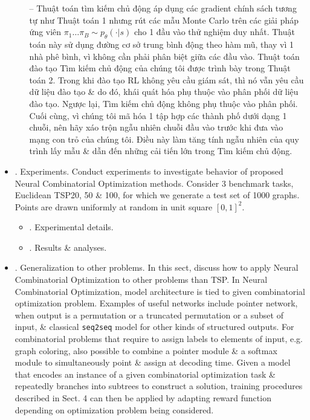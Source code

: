 \documentclass{article}
\begin{document}
\begin{itemize}
\begin{enumerate}
        -- Thuật toán tìm kiếm chủ động áp dụng các gradient chính sách tương tự như Thuật toán 1 nhưng rút các mẫu Monte Carlo trên các giải pháp ứng viên $\pi_1\ldots\pi_B\sim p_\theta(\cdot|s)$ cho 1 đầu vào thử nghiệm duy nhất. Thuật toán này sử dụng đường cơ sở trung bình động theo hàm mũ, thay vì 1 nhà phê bình, vì không cần phải phân biệt giữa các đầu vào. Thuật toán đào tạo Tìm kiếm chủ động của chúng tôi được trình bày trong Thuật toán 2. Trong khi đào tạo RL không yêu cầu giám sát, thì nó vẫn yêu cầu dữ liệu đào tạo \& do đó, khái quát hóa phụ thuộc vào phân phối dữ liệu đào tạo. Ngược lại, Tìm kiếm chủ động không phụ thuộc vào phân phối. Cuối cùng, vì chúng tôi mã hóa 1 tập hợp các thành phố dưới dạng 1 chuỗi, nên hãy xáo trộn ngẫu nhiên chuỗi đầu vào trước khi đưa vào mạng con trỏ của chúng tôi. Điều này làm tăng tính ngẫu nhiên của quy trình lấy mẫu \& dẫn đến những cải tiến lớn trong Tìm kiếm chủ động.
    \end{enumerate}
    \item {. Experiments.} Conduct experiments to investigate behavior of proposed Neural Combinatorial Optimization methods. Consider 3 benchmark tasks, Euclidean TSP20, 50 \& 100, for which we generate a test set of 1000 graphs. Points are drawn uniformly at random in unit square $[0,1]^2$.
    \begin{itemize}
        \item {. Experimental details.}
        \item {. Results \& analyses.}
    \end{itemize}
    \item {. Generalization to other problems.} In this sect, discuss how to apply Neural Combinatorial Optimization to other problems than TSP. In Neural Combinatorial Optimization, model architecture is tied to given combinatorial optimization problem. Examples of useful networks include pointer network, when output is a permutation or a truncated permutation or a subset of input, \& classical {\tt seq2seq} model for other kinds of structured outputs. For combinatorial problems that require to assign labels to elements of input, e.g. graph coloring, also possible to combine a pointer module \& a softmax module to simultaneously point \& assign at decoding time. Given a model that encodes an instance of a given combinatorial optimization task \& repeatedly branches into subtrees to construct a solution, training procedures described in Sect. 4 can then be applied by adapting reward function depending on optimization problem being considered.
    

\end{itemize}
\end{document}
